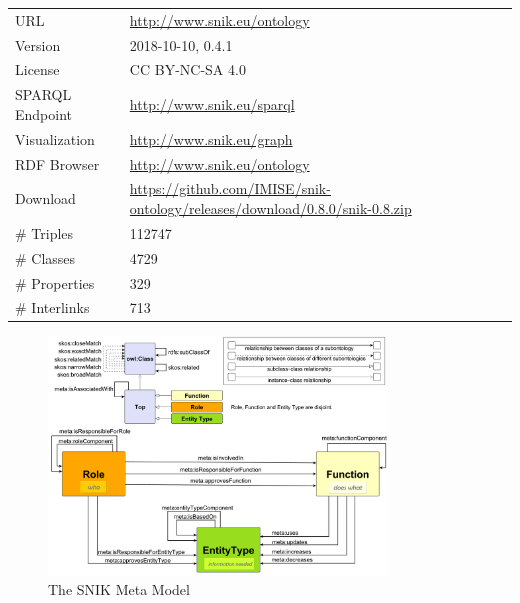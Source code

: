 \documentclass[sw]{iosart2x}
\begin{document}
\begin{tabulary}{\columnwidth}{lL}
\toprule
URL		&\url{http://www.snik.eu/ontology}\\
Version		&2018-10-10, 0.4.1\\
License		&CC BY-NC-SA 4.0\\
SPARQL Endpoint	&\url{http://www.snik.eu/sparql}\\
Visualization	&\url{http://www.snik.eu/graph}\\
RDF Browser	&\url{http://www.snik.eu/ontology}\\
Download	&\url{https://github.com/IMISE/snik-ontology/releases/download/0.8.0/snik-0.8.zip}\\
\# Triples	&\num{112747}\\
\# Classes	&\num{4729}\\
\# Properties	&\num{329}\\
\# Interlinks	&\num{713}\\
\bottomrule
\end{tabulary}%

\begin{figure}
\caption{The SNIK Meta Model}
\label{fig:metamodel}
\includegraphics[width=0.8\textwidth]{img/metamodel9s.pdf}
\end{figure}
\end{document}
